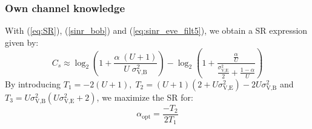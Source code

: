 \documentclass[journal,comsoc]{IEEEtran}
\begin{document}
\subsubsection{Own channel knowledge}
With (\ref{eq:SR}), (\ref{sinr_bob}) and (\ref{eq:sinr_eve_filt5}), we obtain a SR expression given by:
\begin{equation}
C_s \approx \log_2 \left( 1 +  \frac{\alpha \;(U+1)}{U \; \sigma_{\text{V,B}}^2} \right) - \log_2\left( 1 +  \frac{\frac{\alpha }{U}}{\frac{\sigma^2_{\text{V,E}}}{2} + \frac{1-\alpha}{U}}\right)
\label{eq:SR_anal2_decod_5}
\end{equation}
By introducing $T_1=-2(U+1),  \; T_2 = (U+1)(2+U\sigma_{\text{V,E}}^2) - 2U\sigma_{\text{V,B}}^2 $ and $T_3 = U\sigma_{\text{V,B}}^2(U\sigma_{\text{V,E}}^2+2)$, we maximize the SR for:
\begin{equation}
\alpha_{\text{opt}} = \frac{-T_2}{2T_1}
\label{eq:optimal_alpha_decod_5}
\end{equation}


\end{document}
